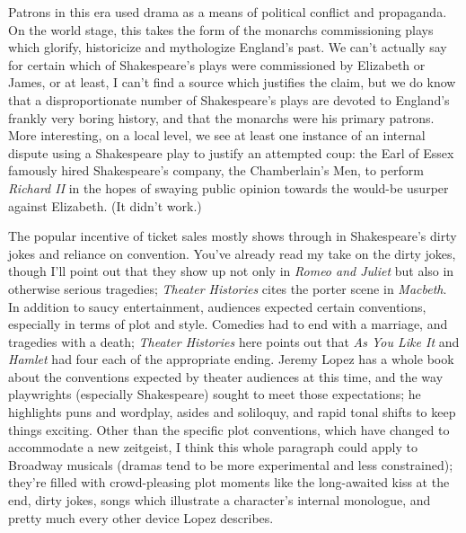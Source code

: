 Patrons in this era used drama as a means of political conflict and propaganda. On the
world stage, this takes the form of the monarchs commissioning plays which glorify,
historicize and mythologize England's past. We can't actually say for certain which of
Shakespeare's plays were commissioned by Elizabeth or James, or at least, I can't find a
source which justifies the claim, but we do know that a disproportionate number of
Shakespeare's plays are devoted to England's frankly very boring history, and that the
monarchs were his primary patrons. More interesting, on a local level, we see at least one
instance of an internal dispute using a Shakespeare play to justify an attempted coup: the
Earl of Essex famously hired Shakespeare's company, the Chamberlain's Men, to perform
\textit{Richard II} in the hopes of swaying public opinion towards the would-be usurper
against Elizabeth. (It didn't work.)

The popular incentive of ticket sales mostly shows through in Shakespeare's dirty jokes
and reliance on convention. You've already read my take on the dirty jokes, though I'll
point out that they show up not only in \textit{Romeo and Juliet} but also in otherwise
serious tragedies; \textit{Theater Histories} cites the porter scene in
\textit{Macbeth}. In addition to saucy entertainment, audiences expected certain
conventions, especially in terms of plot and style. Comedies had to end with a marriage,
and tragedies with a death; \textit{Theater Histories} here points out that \textit{As You
  Like It} and \textit{Hamlet} had four each of the appropriate ending. Jeremy Lopez has a
whole book about the conventions expected by theater audiences at this time, and the way
playwrights (especially Shakespeare) sought to meet those expectations; he highlights puns
and wordplay, asides and soliloquy, and rapid tonal shifts to keep things exciting. Other
than the specific plot conventions, which have changed to accommodate a new zeitgeist, I
think this whole paragraph could apply to Broadway musicals (dramas tend to be more
experimental and less constrained); they're filled with crowd-pleasing plot moments like
the long-awaited kiss at the end, dirty jokes, songs which illustrate a character's
internal monologue, and pretty much every other device Lopez describes.
